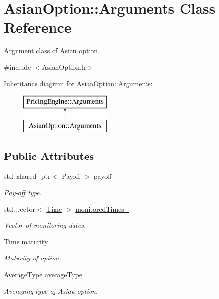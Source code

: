 \hypertarget{class_asian_option_1_1_arguments}{}\section{Asian\+Option\+:\+:Arguments Class Reference}
\label{class_asian_option_1_1_arguments}


Argument class of Asian option.  




{\ttfamily \#include $<$Asian\+Option.\+h$>$}

Inheritance diagram for Asian\+Option\+:\+:Arguments\+:\begin{figure}[H]
\begin{center}
\leavevmode
\includegraphics[height=2.000000cm]{class_asian_option_1_1_arguments}
\end{center}
\end{figure}
\subsection*{Public Attributes}
\begin{DoxyCompactItemize}
\item 
std\+::shared\+\_\+ptr$<$ \hyperlink{class_payoff}{Payoff} $>$ \hyperlink{class_asian_option_1_1_arguments_ae44f022e21c05aa688d1d94a0f57d125}{payoff\+\_\+}
\begin{DoxyCompactList}\small\item\em Pay-\/off type. \end{DoxyCompactList}\item 
std\+::vector$<$ \hyperlink{_name_def_8h_ac2d3e0ba793497bcca555c7c2cf64ff3}{Time} $>$ \hyperlink{class_asian_option_1_1_arguments_a27e013476613aec57076742ba561a722}{monitored\+Times\+\_\+}
\begin{DoxyCompactList}\small\item\em Vector of monitoring dates. \end{DoxyCompactList}\item 
\hyperlink{_name_def_8h_ac2d3e0ba793497bcca555c7c2cf64ff3}{Time} \hyperlink{class_asian_option_1_1_arguments_ad39a2dee07ec9ec77cb64cb75e44a056}{maturity\+\_\+}
\begin{DoxyCompactList}\small\item\em Maturity of option. \end{DoxyCompactList}\item 
\hyperlink{class_asian_option_add7292791bf85820ff9fdbfd4407f3b9}{Average\+Type} \hyperlink{class_asian_option_1_1_arguments_aa93577b436b362136035ed3f6fc742bf}{average\+Type\+\_\+}
\begin{DoxyCompactList}\small\item\em Averaging type of Asian option. \end{DoxyCompactList}\end{DoxyCompactItemize}
